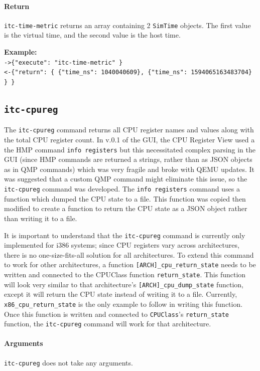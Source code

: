 \documentclass{article}
\newcommand{\code}[1]{\texttt{#1}}
\begin{document}
\paragraph{Return} \code{itc-time-metric} returns an array containing 2 \code{SimTime} objects. The first value is the virtual time, and the second value is the host time.

\textbf{Example:}\\
\code{->\{"execute": "itc-time-metric" \}}\\
\code{<-\{"return": \{ \{"time\_ns": 1040040609\}, \{"time\_ns": 1594065163483704\} \} \}}


\subsection{\code{itc-cpureg}}
\label{sec:itccpureg}
The \code{itc-cpureg} command returns all CPU register names and values along with the total CPU register count. In v.0.1 of the GUI, the CPU Register View used a the HMP command \code{info registers} but this necessitated complex parsing in the GUI (since HMP commands are returned a strings, rather than as JSON objects  as in QMP commands) which was very fragile and broke with QEMU updates. It was suggested that a custom QMP command might eliminate this issue, so the \code{itc-cpureg} command was developed. The \code{info registers} command uses a function which dumped the CPU state to a file. This function was copied then modified to create a function to return the CPU state as a JSON object rather than writing it to a file. 

It is important to understand that the \code{itc-cpureg} command is currently only implemented for i386 systems; since CPU registers vary across architectures, there is no one-size-fits-all solution for all architectures. To extend this command to work for other architectures, a function  \code{[ARCH]\_cpu\_return\_state} needs to be written and connected to the CPUClass function \code{return\_state}. This function will look very similar to that architecture's \code{[ARCH]\_cpu\_dump\_state} function, except it will return the CPU state instead of writing it to a file. Currently, \code{x86\_cpu\_return\_state} is the only example to follow in writing this function. Once this function is written and connected to \code{CPUClass}'s \code{return\_state} function, the \code{itc-cpureg} command will work for that architecture.


\paragraph{Arguments} \code{itc-cpureg} does not take any arguments.
\end{document}
